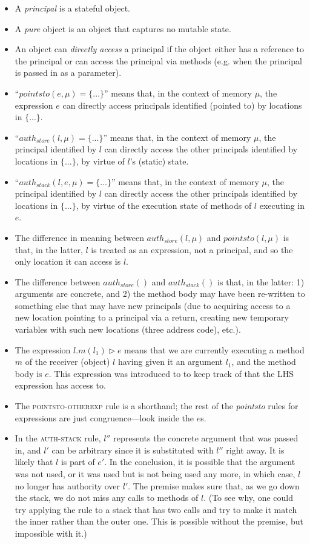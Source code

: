 \documentclass{llncs}
\begin{document}
\begin{itemize}
\item A \textit{principal} is a stateful object.
\item A \textit{pure} object is an object that captures no mutable state.
\item An object can \emph{directly access} a principal if the object either has a reference to the principal or can access the principal via methods (e.g. when the principal is passed in as a parameter).
\item ``$pointsto(e, \mu) = \{ ... \}$'' means that, in the context of memory $\mu$, the expression $e$ can directly access principals identified (pointed to) by locations in $\{ ... \}$.
\item ``$auth_{store}(l, \mu) = \{ ... \}$'' means that, in the context of memory $\mu$, the principal identified by $l$ can directly access the other principals identified by locations in $\{ ... \}$, by virtue of $l$'s (static) state.
\item ``$auth_{stack}(l, e, \mu) = \{ ... \}$'' means that, in the context of memory $\mu$, the principal identified by $l$ can directly access the other principals identified by locations in $\{ ... \}$, by virtue of the execution state of methods of $l$ executing in $e$.
\item The difference in meaning between $auth_{store}(l, \mu)$ and $pointsto(l, \mu)$ is that, in the latter, $l$ is treated as an expression, not a principal, and so the only location it can access is $l$.
\item The difference between $auth_{store}()$ and $auth_{stack}()$ is that, in the latter: 1) arguments are concrete, and 2) the method body may have been re-written to something else that may have new principals (due to acquiring access to a new location pointing to a principal via a return, creating new temporary variables with such new locations (three address code), etc.).
\item The expression $l.m(l_1) \rhd e$ means that we are currently executing a method $m$ of the receiver (object) $l$ having given it an argument $l_1$, and the method body is $e$. This expression was introduced to to keep track of that the LHS expression has access to.
\item The \textsc{pointsto-otherexp} rule is a shorthand; the rest of the \textit{pointsto} rules for expressions are just congruence---look inside the $e$s.
\item In the \textsc{auth-stack} rule, $l''$ represents the concrete argument that was passed in, and $l'$ can be arbitrary since it is substituted with $l''$ right away.  It is likely that $l$ is part of $e'$. In the conclusion, it is possible that the argument was not used, or it was used but is not being used any more, in which case, $l$ no longer has authority over $l'$. The premise makes sure that, as we go down the stack, we do not miss any calls to methods of $l$. (To see why, one could try applying the rule to a stack that has two calls and try to make it match the inner rather than the outer one. This is possible without the premise, but impossible with it.)

\end{itemize}
\end{document}
